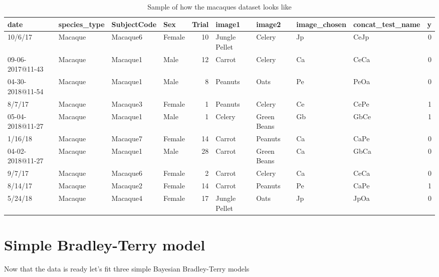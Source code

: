 \documentclass[
]{book}
\begin{document}
\begin{table}

\caption{\label{tab:unnamed-chunk-44}Sample of how the macaques dataset looks like}
\centering
\begin{tabular}[t]{l|l|l|l|r|l|l|l|l|r}
\hline
date & species\_type & SubjectCode & Sex & Trial & image1 & image2 & image\_chosen & concat\_test\_name & y\\
\hline
10/6/17 & Macaque & Macaque6 & Female & 10 & Jungle Pellet & Celery & Jp & CeJp & 0\\
\hline
09-06-2017@11-43 & Macaque & Macaque1 & Male & 12 & Carrot & Celery & Ca & CeCa & 0\\
\hline
04-30-2018@11-54 & Macaque & Macaque1 & Male & 8 & Peanuts & Oats & Pe & PeOa & 0\\
\hline
8/7/17 & Macaque & Macaque3 & Female & 1 & Peanuts & Celery & Ce & CePe & 1\\
\hline
05-04-2018@11-27 & Macaque & Macaque1 & Male & 1 & Celery & Green Beans & Gb & GbCe & 1\\
\hline
1/16/18 & Macaque & Macaque7 & Female & 14 & Carrot & Peanuts & Ca & CaPe & 0\\
\hline
04-02-2018@11-27 & Macaque & Macaque1 & Male & 28 & Carrot & Green Beans & Ca & GbCa & 0\\
\hline
9/7/17 & Macaque & Macaque6 & Female & 2 & Carrot & Celery & Ca & CeCa & 0\\
\hline
8/14/17 & Macaque & Macaque2 & Female & 14 & Carrot & Peanuts & Pe & CaPe & 1\\
\hline
5/24/18 & Macaque & Macaque4 & Female & 17 & Jungle Pellet & Oats & Jp & JpOa & 0\\
\hline
\end{tabular}
\end{table}

\hypertarget{simple-bradley-terry-model}{%
\section{Simple Bradley-Terry model}\label{simple-bradley-terry-model}}

Now that the data is ready let's fit three simple Bayesian Bradley-Terry models
\end{document}
